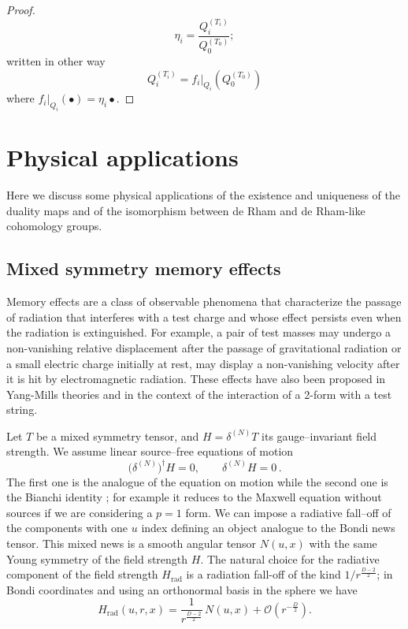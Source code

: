 \documentclass[a4paper,12pt]{article}
\begin{document}
\begin{proof}
\begin{equation}
\eta_i=\frac{Q^{(T_i)}_{i}}{Q^{(T_0)}_{0}};
    \label{etai}
\end{equation}
written in other way 
\begin{equation}
Q^{(T_i)}_{i}=f_i|_{Q_i}(Q^{(T_0)}_{0})
\end{equation}
where $f_i|_{Q_i}(\bullet)=\eta_i \bullet$. 
\end{proof}

\section{Physical applications}\label{phy}
Here we discuss some physical applications of the existence and uniqueness of the duality maps and of the isomorphism between de Rham and de Rham-like cohomology groups. 
\subsection{Mixed symmetry memory effects}
Memory effects \cite{Strominger2018,Godazgar2022,Kumar2022,Mitman2024,Pasterski_2016,Comp_re_2020} are a class of observable phenomena that characterize the passage of radiation that interferes with a test charge and whose effect persists even when the radiation is extinguished. For example, a pair of test masses may undergo a non-vanishing relative displacement after the passage of gravitational radiation or a small electric charge initially at rest, may display a non-vanishing velocity after it is hit by electromagnetic radiation. These effects have also been proposed in Yang-Mills theories and in the context of the interaction of a 2-form with a test string.

Let \( T \) be a mixed symmetry tensor, and
\( H = \delta^{(N)} T \) its gauge–invariant field strength. We assume linear source–free equations of motion
\begin{equation}\label{eq:eom}
\bigl(\delta^{(N)}\bigr)^{\dagger} H = 0 , \qquad \delta^{(N)} H = 0 \, .
\end{equation}
The first one is the analogue of the equation on motion while the second one is the Bianchi identity ; for example it reduces  to the Maxwell equation without sources if we are considering a $p=1$ form. We can impose a radiative fall–off of the components with one \( u \) index defining  an object analogue to the Bondi news tensor. This mixed news is a smooth angular tensor \( N(u,x) \) with the same Young symmetry of the field strength $H$. The natural choice for the radiative component of the field strength $H_{\text{rad}}$ is a radiation fall-off of the kind $1/r^{\frac{D-2}{2}}$; in Bondi coordinates and using an orthonormal basis in the sphere we have
\begin{equation}\label{eq:newsfalloff}
H_{\text{rad}}(u,r,x)
= \frac{1}{r^{\frac{D-2}{2}}}\, N(u,x)
+ \mathcal{O}\!\left(r^{-\frac{D}{2}}\right).
\end{equation}  
\end{document}
